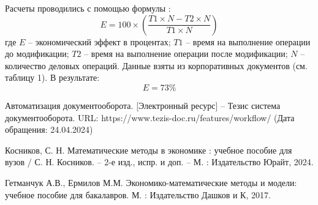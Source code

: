 Расчеты проводились с помощью формулы  \cite{Kosnikov}:
\[
E = 100 \times \left(\frac{{T1 \times N - T2 \times N}}{{T1 \times N}}\right) 
\]
где \(E\) -- экономический эффект в процентах; 
\(T1\) -- время на выполнение операции до модификации; 
\(T2\) -- время на выполнение операции после модификации; 
\(N\) -- количество деловых операций. Данные взяты из корпоративных документов  (см. таблицу 1). В результате:
\[
E =  73\%
\]

\begin{thebibliography}{9} 

 Автоматизация документооборота. [Электронный ресурс] -- Тезис система документооборота. URL: https://www.tezis-doc.ru/features/workflow/ (Дата обращения: 24.04.2024)

Косников, С. Н.  Математические методы в экономике : учебное пособие для вузов / С. Н. Косников. -- 2-е изд., испр. и доп. -- М. : Издательство Юрайт, 2024.

Гетманчук А.В., Ермилов М.М. Экономико-математические методы и модели: учебное пособие для бакалавров. М. :
Издательство Дашков и К, 2017.
\end{thebibliography}





%
